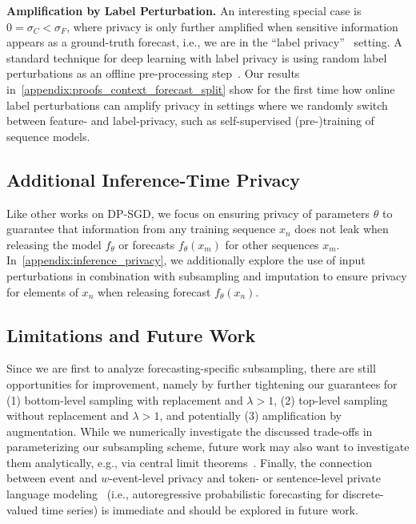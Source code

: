 \textbf{Amplification by Label Perturbation.}
An interesting special case is $0 = \sigma_C < \sigma_F$,
where privacy is only further amplified when sensitive information appears as a ground-truth forecast, i.e., we are in the ``label privacy''~\cite{chaudhuri2011sample} setting.
A standard technique for deep learning with label privacy is using random label perturbations as an offline pre-processing step~\cite{ghazi2021deep}.
Our results in~\cref{appendix:proofs_context_forecast_split} show for the first time how online label perturbations can amplify privacy in settings where we randomly switch between feature- and label-privacy, such as self-supervised (pre-)training of sequence models. 


\subsection{Additional Inference-Time Privacy}\label{section:inference_privacy}
Like other works on DP-SGD, we focus on ensuring privacy of parameters $\theta$ 
to guarantee that information from any training sequence $x_n$ does not leak when releasing the model
$f_\theta$ or forecasts $f_\theta(x_m)$ for other sequences $x_m$.
In~\cref{appendix:inference_privacy}, we additionally explore the use of input perturbations in combination with subsampling and imputation to ensure privacy for elements of $x_n$ when releasing forecast  
$f_\theta(x_n)$. 


\subsection{Limitations and Future Work}
Since we are first to analyze forecasting-specific subsampling, there are still opportunities for improvement, namely by further tightening our guarantees for
(1) bottom-level sampling with replacement and $\lambda > 1$,
(2) top-level sampling without replacement and $\lambda > 1$, and potentially 
(3) amplification by augmentation.
While we numerically investigate the discussed trade-offs
in parameterizing our subsampling scheme, future work may also want to investigate them analytically, e.g., via central limit theorems~\cite{sommer2018privacy,dong2022gaussian}.
Finally, the connection between event and $w$-event-level privacy and token- or sentence-level private language modeling~\cite{hu2024differentially} (i.e., autoregressive probabilistic forecasting for discrete-valued time series) is immediate and should be explored in future work.
